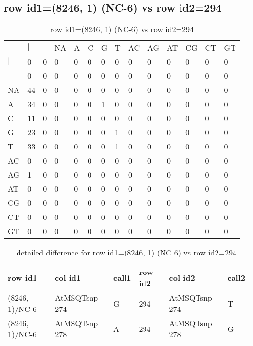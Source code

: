 \subsection{row id1=(8246, 1) (NC-6) vs row id2=294}
\begin{center}
\begin{longtable}{|l|l|l|l|l|l|l|l|l|l|l|l|l|l|}
\caption{row id1=(8246, 1) (NC-6) vs row id2=294} \label{table_dm382}\\
\hline
\\
\hline
&$|$&-&NA&A&C&G&T&AC&AG&AT&CG&CT&GT\\
$|$&0&0&0&0&0&0&0&0&0&0&0&0&0\\
-&0&0&0&0&0&0&0&0&0&0&0&0&0\\
NA&44&0&0&0&0&0&0&0&0&0&0&0&0\\
A&34&0&0&0&0&1&0&0&0&0&0&0&0\\
C&11&0&0&0&0&0&0&0&0&0&0&0&0\\
G&23&0&0&0&0&0&1&0&0&0&0&0&0\\
T&33&0&0&0&0&0&1&0&0&0&0&0&0\\
AC&0&0&0&0&0&0&0&0&0&0&0&0&0\\
AG&1&0&0&0&0&0&0&0&0&0&0&0&0\\
AT&0&0&0&0&0&0&0&0&0&0&0&0&0\\
CG&0&0&0&0&0&0&0&0&0&0&0&0&0\\
CT&0&0&0&0&0&0&0&0&0&0&0&0&0\\
GT&0&0&0&0&0&0&0&0&0&0&0&0&0\\
\hline
\end{longtable}
\end{center}

\begin{center}
\begin{longtable}{|l|l|l|l|l|l|}
\caption{detailed difference for row id1=(8246, 1) (NC-6) vs row id2=294} \label{table_dm383}\\
\hline
row id1&col id1&call1&row id2&col id2&call2\\
\hline
(8246, 1)/NC-6&AtMSQTsnp 274&G&294&AtMSQTsnp 274&T\\
(8246, 1)/NC-6&AtMSQTsnp 278&A&294&AtMSQTsnp 278&G\\
\hline
\end{longtable}
\end{center}

